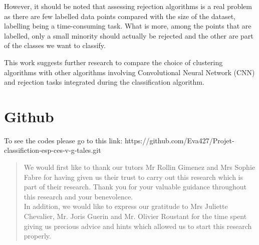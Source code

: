 \documentclass{siamart171218}
\begin{document}
However, it should be noted that assessing rejection algorithms is a real problem as there are few labelled data points compared with the size of the dataset, labelling being a  time-consuming task. What is more, among the points that are labelled, only a small minority should actually be rejected and the other are part of the classes we want to classify.

This work suggests further research to compare the choice of clustering algorithms with other algorithms involving Convolutional Neural Network (CNN)
\cite{laroui:hal-02963115} and rejection tasks integrated during the classification algorithm. 


\section{Github}
To see the codes please go to this link: 
https://github.com/Eva427/Projet-classifiction-esp-ces-v-g-tales.git \\[1cm]

\hline
{}
\renewcommand{\abstractname}{Acknowledgement} 

\begin{abstract}

We would first like to thank our tutors Mr Rollin Gimenez and Mrs Sophie Fabre for having given us their trust to carry out this research which is part of their research. Thank you for your valuable guidance throughout this research and your benevolence. \\

In addition, we would like to express our gratitude to Mrs Juliette Chevalier,  Mr. Joris Guerin and Mr. Olivier Roustant  for the time spent giving us precious advice and hints which allowed us to start this research properly.\\

\end{abstract}
\hline
\end{document}
